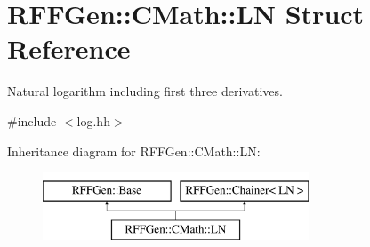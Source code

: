 \hypertarget{structRFFGen_1_1CMath_1_1LN}{\section{R\-F\-F\-Gen\-:\-:C\-Math\-:\-:L\-N Struct Reference}
\label{structRFFGen_1_1CMath_1_1LN}
}


Natural logarithm including first three derivatives.  




{\ttfamily \#include $<$log.\-hh$>$}

Inheritance diagram for R\-F\-F\-Gen\-:\-:C\-Math\-:\-:L\-N\-:\begin{figure}[H]
\begin{center}
\leavevmode
\includegraphics[height=2.000000cm]{structRFFGen_1_1CMath_1_1LN}
\end{center}
\end{figure}
